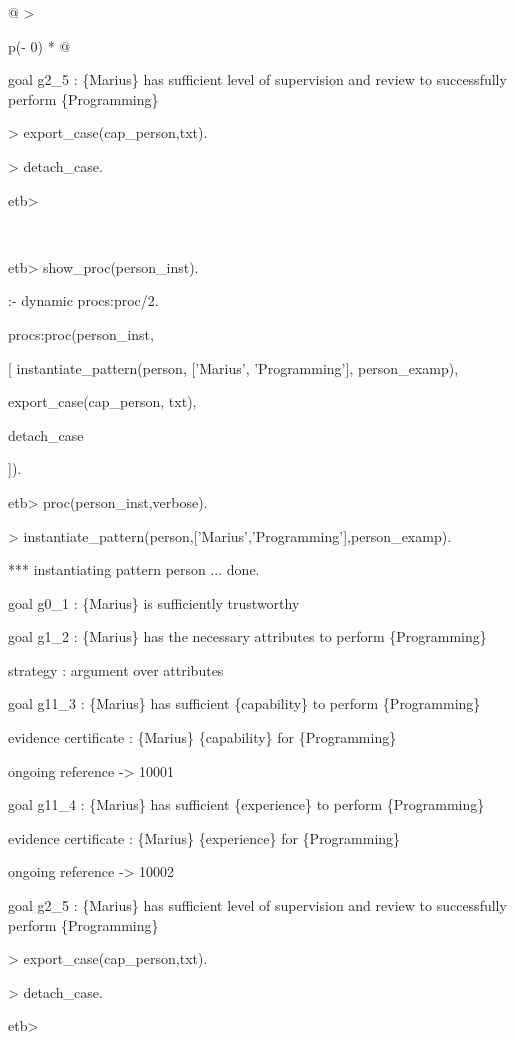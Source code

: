 \documentclass[12pt,twoside,a4paper]{article}
\begin{document}
\begin{longtable}[]{@{}
  >{\raggedright\arraybackslash}p{(\columnwidth - 0\tabcolsep) * }@{}}
\begin{minipage}[b]{\linewidth}
goal g2\_5 : \{Marius\} has sufficient level of supervision and review to successfully perform \{Programming\}

\textgreater{} export\_case(cap\_person,txt).

\textgreater{} detach\_case.

etb\textgreater{}
\end{minipage} \\
\midrule
\endfirsthead
\toprule
\begin{minipage}[b]{\linewidth}\raggedright
etb\textgreater{} show\_proc(person\_inst).

:- dynamic procs:proc/2.

procs:proc(person\_inst,

{[} instantiate\_pattern(person, {[}'Marius', 'Programming'{]}, person\_examp),

export\_case(cap\_person, txt),

detach\_case

{]}).

etb\textgreater{} proc(person\_inst,verbose).

\textgreater{} instantiate\_pattern(person,{[}'Marius','Programming'{]},person\_examp).

*** instantiating pattern person ... done.

goal g0\_1 : \{Marius\} is sufficiently trustworthy

goal g1\_2 : \{Marius\} has the necessary attributes to perform \{Programming\}

strategy : argument over attributes

goal g11\_3 : \{Marius\} has sufficient \{capability\} to perform \{Programming\}

evidence certificate : \{Marius\} \{capability\} for \{Programming\}

ongoing reference -\textgreater{} 10001

goal g11\_4 : \{Marius\} has sufficient \{experience\} to perform \{Programming\}

evidence certificate : \{Marius\} \{experience\} for \{Programming\}

ongoing reference -\textgreater{} 10002

goal g2\_5 : \{Marius\} has sufficient level of supervision and review to successfully perform \{Programming\}

\textgreater{} export\_case(cap\_person,txt).

\textgreater{} detach\_case.

etb\textgreater{}
\end{minipage} \\
\midrule
\endhead
\bottomrule
\end{longtable}
\end{document}
